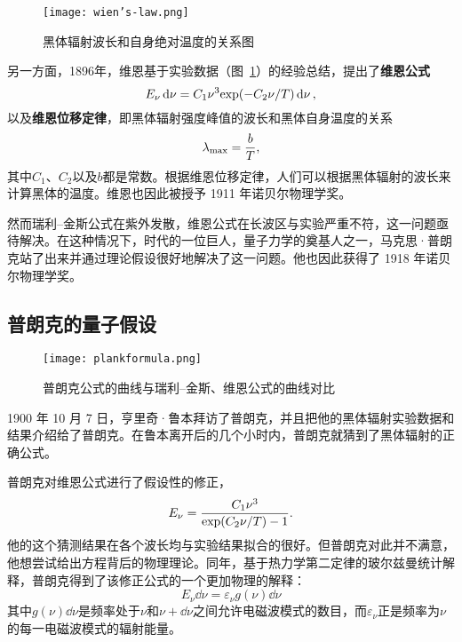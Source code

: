 \begin{figure}
	\centering
	\texttt{[image: wien's-law.png]}
	\caption{黑体辐射波长和自身绝对温度的关系图}
	\label{fig:wein's-law}
\end{figure}
另一方面，1896年，维恩基于实验数据（图~\ref{fig:wein's-law}）的经验总结，提出了\textbf{维恩公式}
\begin{equation}
	E_\nu\dd{\nu}
	=C_1\nu^3 \mathrm{exp}(-C_2\nu/T) \dd{\nu},
\end{equation}
以及\textbf{维恩位移定律}，即黑体辐射强度峰值的波长和黑体自身温度的关系
\begin{equation}
	\lambda_{\mathrm{max}}=\frac{b}{T},
\end{equation}
其中$C_1$、$C_2$以及$b$都是常数。根据维恩位移定律，人们可以根据黑体辐射的波长来计算黑体的温度。维恩也因此被授予 1911 年诺贝尔物理学奖。

然而瑞利--金斯公式在紫外发散，维恩公式在长波区与实验严重不符，这一问题亟待解决。在这种情况下，时代的一位巨人，量子力学的奠基人之一，马克思·普朗克站了出来并通过理论假设很好地解决了这一问题。他也因此获得了 1918 年诺贝尔物理学奖。

\subsection{普朗克的量子假设}
\begin{figure}[H]
	\centering
	\texttt{[image: plankformula.png]}
	\caption{普朗克公式的曲线与瑞利--金斯、维恩公式的曲线对比}
\end{figure}
1900 年 10 月 7 日，亨里奇·鲁本拜访了普朗克，并且把他的黑体辐射实验数据和结果介绍给了普朗克。在鲁本离开后的几个小时内，普朗克就猜到了黑体辐射的正确公式。

普朗克对维恩公式进行了假设性的修正，
\begin{equation}
	E_\nu = \frac{C_1 \nu^3}{\mathrm{exp}(C_2\nu/T)-1}.
\end{equation}
他的这个猜测结果在各个波长均与实验结果拟合的很好。但普朗克对此并不满意，他想尝试给出方程背后的物理理论。同年，基于热力学第二定律的玻尔兹曼统计解释，普朗克得到了该修正公式的一个更加物理的解释：
\begin{equation}
	E_\nu\dd{\nu}= \varepsilon_\nu g(\nu)\dd{\nu}
\end{equation}
其中$g(\nu)\dd{\nu}$是频率处于$\nu$和$\nu+\dd{\nu}$之间允许电磁波模式的数目，而$\varepsilon_\nu$正是频率为$\nu$的每一电磁波模式的辐射能量。

